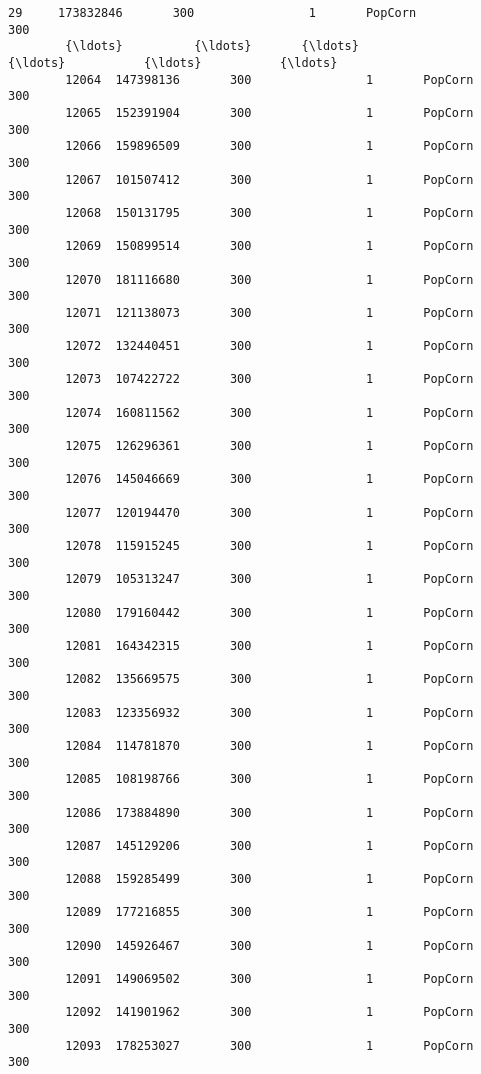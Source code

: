 \documentclass[11pt]{article}
\begin{document}
\begin{Verbatim}[commandchars=\\\{\}]
        29     173832846       300                1       PopCorn           300   
        {\ldots}          {\ldots}       {\ldots}              {\ldots}           {\ldots}           {\ldots}   
        12064  147398136       300                1       PopCorn           300   
        12065  152391904       300                1       PopCorn           300   
        12066  159896509       300                1       PopCorn           300   
        12067  101507412       300                1       PopCorn           300   
        12068  150131795       300                1       PopCorn           300   
        12069  150899514       300                1       PopCorn           300   
        12070  181116680       300                1       PopCorn           300   
        12071  121138073       300                1       PopCorn           300   
        12072  132440451       300                1       PopCorn           300   
        12073  107422722       300                1       PopCorn           300   
        12074  160811562       300                1       PopCorn           300   
        12075  126296361       300                1       PopCorn           300   
        12076  145046669       300                1       PopCorn           300   
        12077  120194470       300                1       PopCorn           300   
        12078  115915245       300                1       PopCorn           300   
        12079  105313247       300                1       PopCorn           300   
        12080  179160442       300                1       PopCorn           300   
        12081  164342315       300                1       PopCorn           300   
        12082  135669575       300                1       PopCorn           300   
        12083  123356932       300                1       PopCorn           300   
        12084  114781870       300                1       PopCorn           300   
        12085  108198766       300                1       PopCorn           300   
        12086  173884890       300                1       PopCorn           300   
        12087  145129206       300                1       PopCorn           300   
        12088  159285499       300                1       PopCorn           300   
        12089  177216855       300                1       PopCorn           300   
        12090  145926467       300                1       PopCorn           300   
        12091  149069502       300                1       PopCorn           300   
        12092  141901962       300                1       PopCorn           300   
        12093  178253027       300                1       PopCorn           300   
        

\end{Verbatim}
\end{document}
